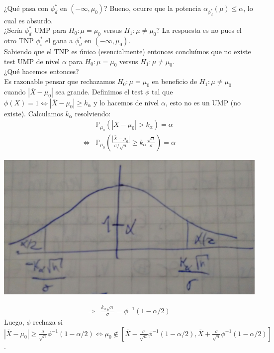 \documentclass[10pt]{article}
\theoremstyle{plain}
\theoremstyle{definition}
\begin{document}
¿Qué pasa con $\phi^*_{d}$ en $(-\infty, \mu_{0})$? Bueno, ocurre que la potencia $\alpha_{\phi^*_{d}}(\mu) \le \alpha$, lo cual es absurdo.\\

¿Sería $\phi^*_{d}$ UMP para $H_{0}: \mu=\mu_{0}$ versus $H_{1}: \mu \not = \mu_{0}$? La respuesta es no pues el otro TNP $\phi^*_{i}$ el gana a $\phi^*_{d}$ en $(-\infty, \mu_{0})$.\\

Sabiendo que el TNP es único (esencialmente) entonces concluímos que no existe test UMP de nivel $\alpha$ para $H_{0}: \mu = \mu_{0}$ versus $H_{1}: \mu \not = \mu_{0}$.\\

¿Qué hacemos entonces?\\
Es razonable pensar que rechazamos $H_{0}: \mu = \mu_{0}$ en beneficio de $H_{1}: \mu \not = \mu_{0}$ cuando $|\bar{X}-\mu_{0}|$ sea grande. Definimos el test $\phi$ tal que $\phi(X)=1 \Leftrightarrow |\bar{X}-\mu_{0}|\ge k_{\alpha}$ y lo hacemos de nivel $\alpha$, esto no es un UMP (no existe). Calculamos $k_{\alpha}$ resolviendo:
\begin{align*}
&\mathbb{P}_{\mu_{0}}\left(|\bar{X}-\mu_{0}|>k_{\alpha}\right) = \alpha\\
 \Leftrightarrow & \mathbb{P}_{\mu_{0}}\left(\frac{|\bar{X}-\mu_{0}|}{\sigma/\sqrt{n}}\ge k_{\alpha}\frac{\sqrt{n}}{\sigma}\right) = \alpha
\end{align*}
\begin{center}
\includegraphics[scale=0.1]{imagenes/bilateral.jpg}
\end{center}
\begin{align*}
\Rightarrow & \frac{k_{\alpha}\sqrt{n}}{\sigma} = \phi^{-1}(1-\alpha/2)
\end{align*}
Luego, $\phi$ rechaza si $|\bar{X}-\mu_{0}| \ge \frac{\sigma}{\sqrt{n}}\phi^{-1}(1-\alpha/2) \Leftrightarrow \mu_{0} \not \in [\bar{X}-\frac{\sigma}{\sqrt{n}}\phi^{-1}(1-\alpha/2), \bar{X}+\frac{\sigma}{\sqrt{n}}\phi^{-1}(1-\alpha/2)]$.\\
\end{document}
